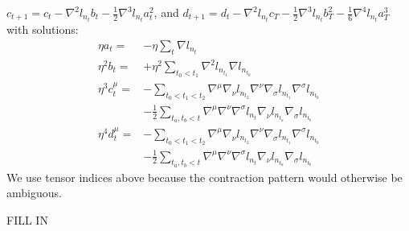 \documentclass{article}
\begin{document}
            $
                c_{t+1} = c_t -\nabla^2 l_{n_t} b_t 
                              -\frac{1}{2} \nabla^3 l_{n_t} a_t^2
            $, and
            $
                d_{t+1} = d_t -             \nabla^2 l_{n_t} c_T
                              - \frac{1}{2} \nabla^3 l_{n_t} b_T^2 
                              - \frac{1}{6} \nabla^4 l_{n_t} a_T^3 
            $
            with solutions:
            \begin{align*}
                \eta a_t = &-\eta \sum_{t} \nabla l_{n_t}
                \\ 
                \eta^2 b_t = &+\eta^2 \sum_{t_0 < t_1} \nabla^2 l_{n_{t_1}} \nabla l_{n_{t_0}}
                \\
                \eta^3 c_t^\mu =
                    &-\sum_{t_0 < t_1 < t_2} 
                        \nabla^\mu \nabla_\nu l_{n_{t_2}}
                        \nabla^\nu \nabla_\sigma l_{n_{t_1}} \nabla^\sigma l_{n_{t_0}} \\
                    &-\frac{1}{2}
                        \sum_{t_a, t_b < t}
                        \nabla^\mu \nabla^\nu \nabla^\sigma l_{n_t}
                        \nabla_\nu l_{n_{t_a}}
                        \nabla_\sigma l_{n_{t_b}}
                \\
                \eta^4 d_t^\mu =
                    &-\sum_{t_0 < t_1 < t_2} 
                        \nabla^\mu \nabla_\nu l_{n_{t_2}}
                        \nabla^\nu \nabla_\sigma l_{n_{t_1}} \nabla^\sigma l_{n_{t_0}} \\
                    &-\frac{1}{2}
                        \sum_{t_a, t_b < t}
                        \nabla^\mu \nabla^\nu \nabla^\sigma l_{n_t}
                        \nabla_\nu l_{n_{t_a}}
                        \nabla_\sigma l_{n_{t_b}}
            \end{align*}
            We use tensor indices above because the contraction pattern would
            otherwise be ambiguous.

            {\color{moor} FILL IN}
\end{document}
